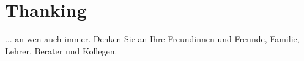 \documentclass[a4paper,11pt,oneside,final,english,toc=bib,draft]{scrbook}
\begin{document}

\chapter{Thanking} %
\label{cha:thanking}

... an wen auch immer. Denken Sie an Ihre Freundinnen und Freunde, 
Familie, Lehrer, Berater und Kollegen.





% 

\end{document}
